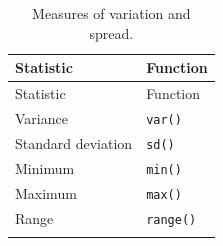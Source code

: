 \documentclass[english,10pt,a4paper,oneside]{book}
\theoremstyle{definition}
\theoremstyle{definition}
\theoremstyle{definition}
\theoremstyle{remark}
\begin{document}
\begin{longtable}[]{@{}ll@{}}
\caption{Measures of variation and spread.}\tabularnewline
\toprule
\begin{minipage}[b]{0.29\columnwidth}\raggedright
Statistic\strut
\end{minipage} & \begin{minipage}[b]{0.29\columnwidth}\raggedright
Function\strut
\end{minipage}\tabularnewline
\midrule
\endfirsthead
\toprule
\begin{minipage}[b]{0.29\columnwidth}\raggedright
Statistic\strut
\end{minipage} & \begin{minipage}[b]{0.29\columnwidth}\raggedright
Function\strut
\end{minipage}\tabularnewline
\midrule
\endhead
\begin{minipage}[t]{0.29\columnwidth}\raggedright
Variance\strut
\end{minipage} & \begin{minipage}[t]{0.29\columnwidth}\raggedright
\texttt{var()}\strut
\end{minipage}\tabularnewline
\begin{minipage}[t]{0.29\columnwidth}\raggedright
Standard deviation\strut
\end{minipage} & \begin{minipage}[t]{0.29\columnwidth}\raggedright
\texttt{sd()}\strut
\end{minipage}\tabularnewline
\begin{minipage}[t]{0.29\columnwidth}\raggedright
Minimum\strut
\end{minipage} & \begin{minipage}[t]{0.29\columnwidth}\raggedright
\texttt{min()}\strut
\end{minipage}\tabularnewline
\begin{minipage}[t]{0.29\columnwidth}\raggedright
Maximum\strut
\end{minipage} & \begin{minipage}[t]{0.29\columnwidth}\raggedright
\texttt{max()}\strut
\end{minipage}\tabularnewline
\begin{minipage}[t]{0.29\columnwidth}\raggedright
Range\strut
\end{minipage} & \begin{minipage}[t]{0.29\columnwidth}\raggedright
\texttt{range()}\strut
\end{minipage}\tabularnewline
\begin{minipage}[t]{0.29\columnwidth}\raggedright

\end{minipage}
\end{longtable}
\end{document}
